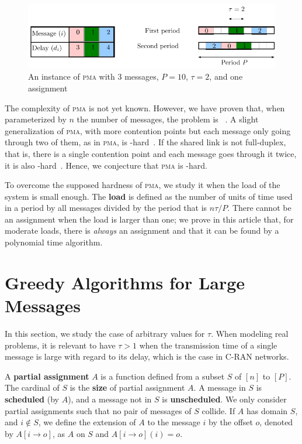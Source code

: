 \documentclass[a4paper,cleveref, autoref, thm-restate,UKenglish]{lipics-v2019}
\newcommand\pma{\textsc{pma}\xspace}
\begin{document}
\begin{figure}
\begin{center}
\includegraphics[scale=0.7]{instance}
\end{center}
\caption{An instance of \pma with $3$ messages, $P= 10$, $\tau = 2$, and one assignment}
\label{fig:assignment}
\end{figure}


The complexity of \pma is not yet known. However, we have proven that, when parameterized by
$n$ the number of messages, the problem is \FPT~\cite{barth2018deterministic}.
A slight generalization of \pma, with more contention points but each message only going through two of them, as in \pma, is \NP-hard~\cite{barth2018deterministic}. If the shared link is not full-duplex, that is, there is a single contention point and each message goes through it twice, it is also \NP-hard~\cite{orman1997complexity}. Hence, we conjecture that \pma is \NP-hard.

To overcome the supposed hardness of \pma, we study it when the load of the system is small enough. The \textbf{load} is defined as the number of units of time used in a period by all messages divided by the period that is $n\tau /P$. There cannot be an assignment when the load is larger than one; we prove in this article that, for moderate loads, there is \emph{always} an assignment and that it can be found by a polynomial time algorithm.



\section{Greedy Algorithms for Large Messages} \label{sec:large}

In this section, we study the case of arbitrary values for $\tau$. When modeling real problems,
it is relevant to have $\tau > 1$ when the transmission time of a single message is large with regard to its delay,
which is the case in C-RAN networks.

A \textbf{partial assignment} $A$ is a function defined from a subset $S$ of $[n]$ to $[P]$.
The cardinal of $S$ is the \textbf{size} of partial assignment $A$. A message in $S$ is \textbf{scheduled} (by $A$), and a message not in $S$ is \textbf{unscheduled}. We only consider partial assignments such that no pair of messages of $S$ collide. If $A$ has domain $S$, and $i \notin S$, we define the extension of $A$ to the message $i$ by the offset $o$, denoted by $A[i \rightarrow o]$, as $A$ on $S$ and $A[i \rightarrow o](i) = o$.
\end{document}

